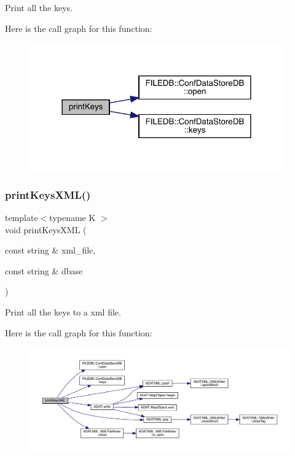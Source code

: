 Print all the keys. 

Here is the call graph for this function\+:
\nopagebreak
\begin{figure}[H]
\begin{center}
\leavevmode
\includegraphics[width=310pt]{d7/d1d/adat-devel_2main_2dbutil_2dbkeys_8cc_a05c6483ffb9fa71112b451a5dd7eb935_cgraph}
\end{center}
\end{figure}
\mbox{\label{adat-devel_2main_2dbutil_2dbkeys_8cc_a44428d59560cb466420c5c0ca60315e5}} 
\subsubsection{\texorpdfstring{printKeysXML()}{printKeysXML()}}
{\footnotesize\ttfamily template$<$typename K $>$ \\
void print\+Keys\+X\+ML (\begin{DoxyParamCaption}\item[{const string \&}]{xml\+\_\+file,  }\item[{const string \&}]{dbase }\end{DoxyParamCaption})}



Print all the keys to a xml file. 

Here is the call graph for this function\+:
\nopagebreak
\begin{figure}[H]
\begin{center}
\leavevmode
\includegraphics[width=350pt]{d7/d1d/adat-devel_2main_2dbutil_2dbkeys_8cc_a44428d59560cb466420c5c0ca60315e5_cgraph}
\end{center}
\end{figure}
